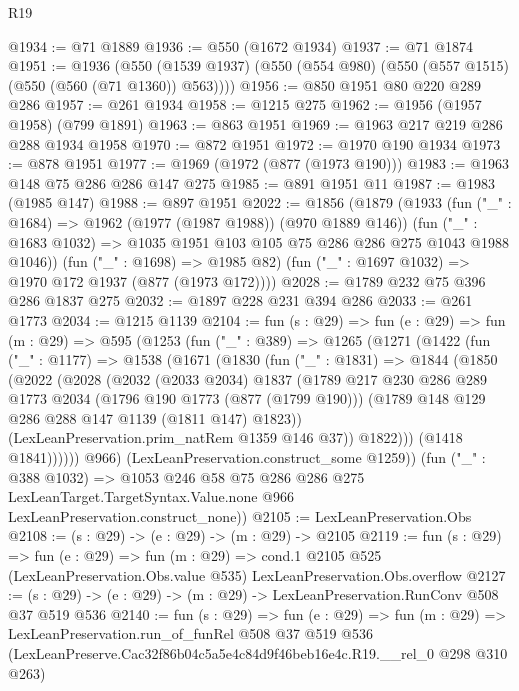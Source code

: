 \begin{lexlean}{R19}
\begin{coremodule}
@1934 := @71 @1889
@1936 := @550 (@1672 @1934)
@1937 := @71 @1874
@1951 := @1936
    (@550 (@1539 @1937) (@550 (@554 @980) (@550 (@557 @1515) (@550 (@560 (@71 @1360)) @563))))
@1956 := @850 @1951 @80 @220 @289 @286
@1957 := @261 @1934
@1958 := @1215 @275
@1962 := @1956 (@1957 @1958) (@799 @1891)
@1963 := @863 @1951
@1969 := @1963 @217 @219 @286 @288 @1934 @1958
@1970 := @872 @1951
@1972 := @1970 @190 @1934
@1973 := @878 @1951
@1977 := @1969 (@1972 (@877 (@1973 @190)))
@1983 := @1963 @148 @75 @286 @286 @147 @275
@1985 := @891 @1951 @11
@1987 := @1983 (@1985 @147)
@1988 := @897 @1951
@2022 := @1856
    (@1879
      (@1933
        (fun ("_" : @1684) => @1962 (@1977 (@1987 @1988)) (@970 @1889 @146))
        (fun ("_" : @1683 @1032) => @1035 @1951 @103 @105 @75 @286 @286 @275 @1043 @1988 @1046))
      (fun ("_" : @1698) => @1985 @82)
      (fun ("_" : @1697 @1032) => @1970 @172 @1937 (@877 (@1973 @172))))
@2028 := @1789 @232 @75 @396 @286 @1837 @275
@2032 := @1897 @228 @231 @394 @286
@2033 := @261 @1773
@2034 := @1215 @1139
@2104 := fun (s : @29) =>
  fun (e : @29) =>
  fun (m : @29) =>
  @595
    (@1253
      (fun ("_" : @389) =>
      @1265
        (@1271
          (@1422
            (fun ("_" : @1177) =>
            @1538
              (@1671
                (@1830
                  (fun ("_" : @1831) =>
                  @1844
                    (@1850
                      (@2022
                        (@2028
                          (@2032
                            (@2033 @2034)
                            @1837
                            (@1789
                              @217
                              @230
                              @286
                              @289
                              @1773
                              @2034
                              (@1796 @190 @1773 (@877 (@1799 @190)))
                              (@1789 @148 @129 @286 @288 @147 @1139 (@1811 @147) @1823))
                            (LexLeanPreservation.prim_natRem @1359 @146 @37))
                          @1822)))
                    (@1418 @1841))))))
          @966)
        (LexLeanPreservation.construct_some @1259))
      (fun ("_" : @388 @1032) =>
      @1053
        @246
        @58
        @75
        @286
        @286
        @275
        LexLeanTarget.TargetSyntax.Value.none
        @966
        LexLeanPreservation.construct_none))
@2105 := LexLeanPreservation.Obs
@2108 := (s : @29) -> (e : @29) -> (m : @29) -> @2105
@2119 := fun (s : @29) =>
  fun (e : @29) =>
  fun (m : @29) =>
  cond.{1} @2105 @525 (LexLeanPreservation.Obs.value @535) LexLeanPreservation.Obs.overflow
@2127 := (s : @29) -> (e : @29) -> (m : @29) -> LexLeanPreservation.RunConv @508 @37 @519 @536
@2140 := fun (s : @29) =>
  fun (e : @29) =>
  fun (m : @29) =>
  LexLeanPreservation.run_of_funRel
    @508
    @37
    @519
    @536
    (LexLeanPreserve.Cac32f86b04c5a5e4c84d9f46beb16e4c.R19.__rel_0 @298 @310 @263)
\end{coremodule}
\end{lexlean}
